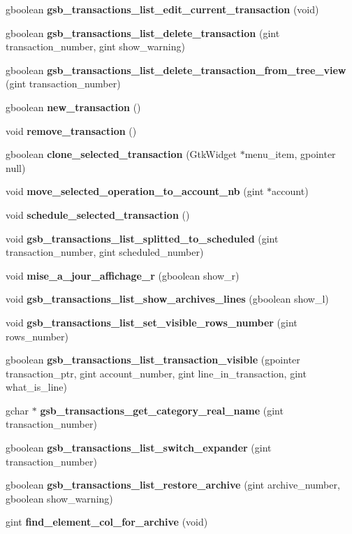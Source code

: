 \begin{DoxyCompactItemize}
\item 
gboolean {\bf gsb\_\-transactions\_\-list\_\-edit\_\-current\_\-transaction} (void)
\item 
gboolean {\bf gsb\_\-transactions\_\-list\_\-delete\_\-transaction} (gint transaction\_\-number, gint show\_\-warning)
\item 
gboolean {\bf gsb\_\-transactions\_\-list\_\-delete\_\-transaction\_\-from\_\-tree\_\-view} (gint transaction\_\-number)
\item 
gboolean {\bf new\_\-transaction} ()
\item 
void {\bf remove\_\-transaction} ()
\item 
gboolean {\bf clone\_\-selected\_\-transaction} (GtkWidget $\ast$menu\_\-item, gpointer null)
\item 
void {\bf move\_\-selected\_\-operation\_\-to\_\-account\_\-nb} (gint $\ast$account)
\item 
void {\bf schedule\_\-selected\_\-transaction} ()
\item 
void {\bf gsb\_\-transactions\_\-list\_\-splitted\_\-to\_\-scheduled} (gint transaction\_\-number, gint scheduled\_\-number)
\item 
void {\bf mise\_\-a\_\-jour\_\-affichage\_\-r} (gboolean show\_\-r)
\item 
void {\bf gsb\_\-transactions\_\-list\_\-show\_\-archives\_\-lines} (gboolean show\_\-l)
\item 
void {\bf gsb\_\-transactions\_\-list\_\-set\_\-visible\_\-rows\_\-number} (gint rows\_\-number)
\item 
gboolean {\bf gsb\_\-transactions\_\-list\_\-transaction\_\-visible} (gpointer transaction\_\-ptr, gint account\_\-number, gint line\_\-in\_\-transaction, gint what\_\-is\_\-line)
\item 
gchar $\ast$ {\bf gsb\_\-transactions\_\-get\_\-category\_\-real\_\-name} (gint transaction\_\-number)
\item 
gboolean {\bf gsb\_\-transactions\_\-list\_\-switch\_\-expander} (gint transaction\_\-number)
\item 
gboolean {\bf gsb\_\-transactions\_\-list\_\-restore\_\-archive} (gint archive\_\-number, gboolean show\_\-warning)
\item 
gint {\bf find\_\-element\_\-col\_\-for\_\-archive} (void)
\end{DoxyCompactItemize}
